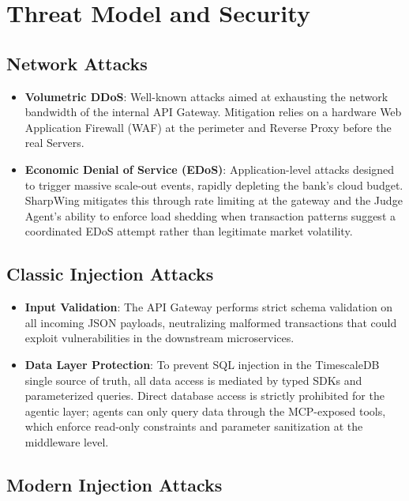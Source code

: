 \documentclass[12pt]{report}
\begin{document}
\chapter{Threat Model and Security}
\label{ch:threat_model}

\section{Network Attacks}

\begin{itemize}
    \item \textbf{Volumetric DDoS}: Well-known attacks aimed at exhausting the network bandwidth of the internal API Gateway. Mitigation relies on a hardware Web Application Firewall (WAF) at the perimeter and Reverse Proxy before the real Servers.
    
    \item \textbf{Economic Denial of Service (EDoS)}: Application-level attacks designed to trigger massive scale-out events, rapidly depleting the bank's cloud budget. SharpWing mitigates this through rate limiting at the gateway and the Judge Agent's ability to enforce load shedding when transaction patterns suggest a coordinated EDoS attempt rather than legitimate market volatility.
\end{itemize}

\section{Classic Injection Attacks}

\begin{itemize}
    \item \textbf{Input Validation}: The API Gateway performs strict schema validation on all incoming JSON payloads, neutralizing malformed transactions that could exploit vulnerabilities in the downstream microservices.
    
    \item \textbf{Data Layer Protection}: To prevent SQL injection in the TimescaleDB single source of truth, all data access is mediated by typed SDKs and parameterized queries. Direct database access is strictly prohibited for the agentic layer; agents can only query data through the MCP-exposed tools, which enforce read-only constraints and parameter sanitization at the middleware level.
\end{itemize}

\section{Modern Injection Attacks}
\end{document}

